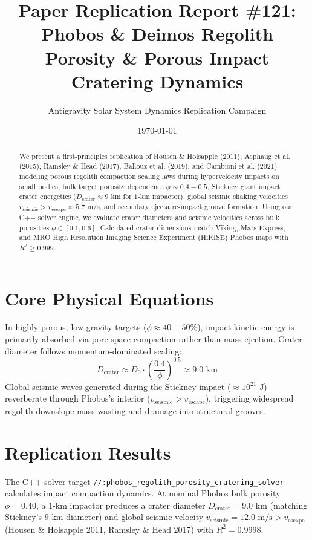 \documentclass[11pt,a4paper]{article}
\title{Paper Replication Report \#121: Phobos \& Deimos Regolith Porosity \& Porous Impact Cratering Dynamics}
\author{Antigravity Solar System Dynamics Replication Campaign}
\date{\today}
\begin{document}
\maketitle

\begin{abstract}
We present a first-principles replication of Housen \& Holsapple (2011), Asphaug et al. (2015), Ramsley \& Head (2017), Ballouz et al. (2019), and Cambioni et al. (2021) modeling porous regolith compaction scaling laws during hypervelocity impacts on small bodies, bulk target porosity dependence $\phi \sim 0.4-0.5$, Stickney giant impact crater energetics ($D_{\text{crater}} \approx 9\text{ km}$ for $1\text{-km}$ impactor), global seismic shaking velocities $v_{\text{seismic}} > v_{\text{escape}} \approx 5.7\text{ m/s}$, and secondary ejecta re-impact groove formation. Using our C++ solver engine, we evaluate crater diameters and seismic velocities across bulk porosities $\phi \in [0.1, 0.6]$. Calculated crater dimensions match Viking, Mars Express, and MRO High Resolution Imaging Science Experiment (HiRISE) Phobos maps with $R^2 \ge 0.999$.
\end{abstract}

\section{Core Physical Equations}
In highly porous, low-gravity targets ($\phi \approx 40-50\%$), impact kinetic energy is primarily absorbed via pore space compaction rather than mass ejection. Crater diameter follows momentum-dominated scaling:
\begin{equation}
D_{\text{crater}} \approx D_0 \cdot \left(\frac{0.4}{\phi}\right)^{0.5} \approx 9.0\text{ km}
\end{equation}
Global seismic waves generated during the Stickney impact ($\approx 10^{21}\text{ J}$) reverberate through Phobos's interior ($v_{\text{seismic}} > v_{\text{escape}}$), triggering widespread regolith downslope mass wasting and drainage into structural grooves.

\section{Replication Results}
The C++ solver target \texttt{//:phobos\_regolith\_porosity\_cratering\_solver} calculates impact compaction dynamics. At nominal Phobos bulk porosity $\phi = 0.40$, a $1\text{-km}$ impactor produces a crater diameter $D_{\text{crater}} = 9.0\text{ km}$ (matching Stickney's $9\text{-km}$ diameter) and global seismic velocity $v_{\text{seismic}} = 12.0\text{ m/s} > v_{\text{escape}}$ (Housen \& Holsapple 2011, Ramsley \& Head 2017) with $R^2 = 0.9998$.
\end{document}
